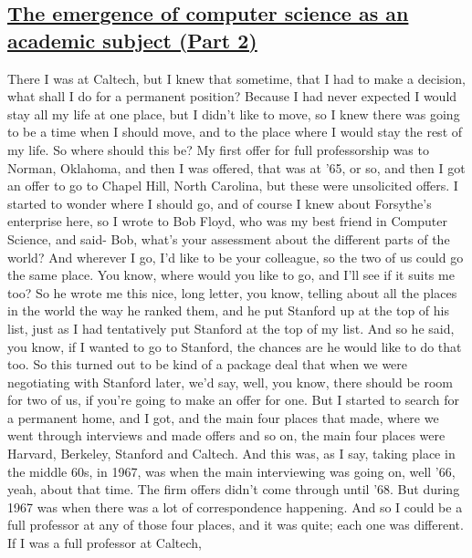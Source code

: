 \documentclass[]{article}
\begin{document}
\subsection{\texorpdfstring{\href{http://webofstories.com/play/17103}{The
emergence of computer science as an academic subject (Part
2)}}{The emergence of computer science as an academic subject (Part 2)}}\label{the-emergence-of-computer-science-as-an-academic-subject-part-2}

There I was at Caltech, but I knew that sometime, that I had to make a
decision, what shall I do for a permanent position? Because I had never
expected I would stay all my life at one place, but I didn't like to
move, so I knew there was going to be a time when I should move, and to
the place where I would stay the rest of my life. So where should this
be? My first offer for full professorship was to Norman, Oklahoma, and
then I was offered, that was at '65, or so, and then I got an offer to
go to Chapel Hill, North Carolina, but these were unsolicited offers. I
started to wonder where I should go, and of course I knew about
Forsythe's enterprise here, so I wrote to Bob Floyd, who was my best
friend in Computer Science, and said- Bob, what's your assessment about
the different parts of the world? And wherever I go, I'd like to be your
colleague, so the two of us could go the same place. You know, where
would you like to go, and I'll see if it suits me too? So he wrote me
this nice, long letter, you know, telling about all the places in the
world the way he ranked them, and he put Stanford up at the top of his
list, just as I had tentatively put Stanford at the top of my list. And
so he said, you know, if I wanted to go to Stanford, the chances are he
would like to do that too. So this turned out to be kind of a package
deal that when we were negotiating with Stanford later, we'd say, well,
you know, there should be room for two of us, if you're going to make an
offer for one. But I started to search for a permanent home, and I got,
and the main four places that made, where we went through interviews and
made offers and so on, the main four places were Harvard, Berkeley,
Stanford and Caltech. And this was, as I say, taking place in the middle
60s, in 1967, was when the main interviewing was going on, well '66,
yeah, about that time. The firm offers didn't come through until '68.
But during 1967 was when there was a lot of correspondence happening.
And so I could be a full professor at any of those four places, and it
was quite; each one was different. If I was a full professor at Caltech,
\end{document}
